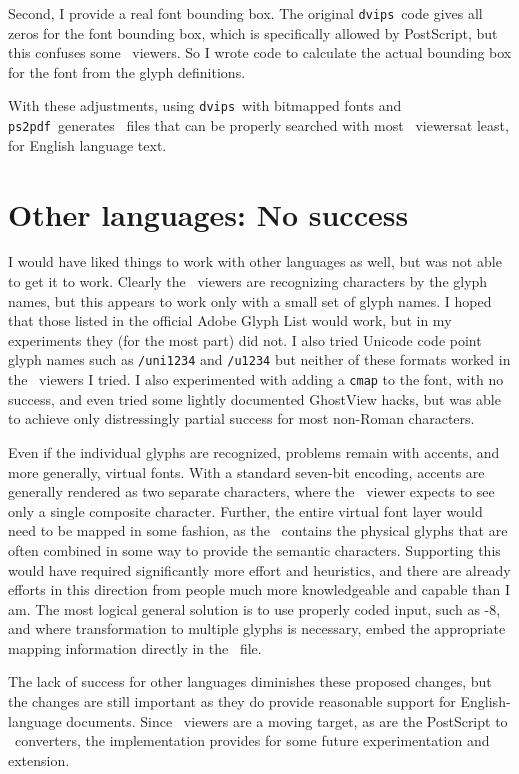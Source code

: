 \documentclass[final]{ltugboat}
\def\PDF{\acro{PDF}}
\def\dvips{\texttt{dvips}}
\def\ps2pdf{\texttt{ps2pdf}}
\begin{document}
Second, I provide a real font bounding
box.  The original \dvips\ code gives all zeros for the font
bounding box, which is specifically allowed by PostScript,
but this confuses some \PDF\ viewers.  So I wrote code to
calculate the actual bounding box for the font from the
glyph definitions.

With these adjustments, using \dvips\ with bitmapped fonts
and \ps2pdf\ generates \PDF\ files that can be properly
searched with most \PDF\ viewers\Dash at least, for English
language text.

\section{Other languages: No success}

I would have liked things to work with other languages as
well, but was not able to get it to work.  Clearly the
\PDF\ viewers are recognizing characters by the glyph
names, but this appears to work only with a small set of
glyph names.  I hoped that those listed in the official
Adobe Glyph List \cite{AGL} would work, but in my experiments they
(for the most part) did not.  I also tried Unicode code
point glyph names such as \texttt{/uni1234} and \texttt{/u1234}
but neither of these formats worked in the \PDF\ viewers
I tried.  I also experimented with adding a \texttt{cmap}
to the font, with no success, and even tried some lightly
documented GhostView hacks, but was able to achieve only
distressingly partial success for most non-Roman characters.

Even if the individual glyphs are recognized, problems remain
with accents, and more generally, virtual fonts.
With a standard seven-bit encoding, accents are generally
rendered as two separate characters, where the \PDF\ viewer
expects to see only a single composite character.  Further,
the entire virtual font layer would need to be mapped in
some fashion, as the \PDF\ contains the physical glyphs
that are often combined in some way to provide the semantic
characters.  Supporting this would have required significantly
more effort and heuristics, and there are already efforts in
this direction from people much more knowledgeable and capable
than I am.  The most logical general solution is to use properly
coded input, such as -8, and where transformation to multiple
glyphs is necessary, embed the appropriate mapping information
directly in the \PDF\ file.

The lack of success for other languages diminishes these
proposed changes, but the changes are still important as they
do provide reasonable support for English-language documents.
Since \PDF\ viewers are a moving target, as are the PostScript
to \PDF\ converters, the implementation provides for some future
experimentation and extension.
\end{document}
